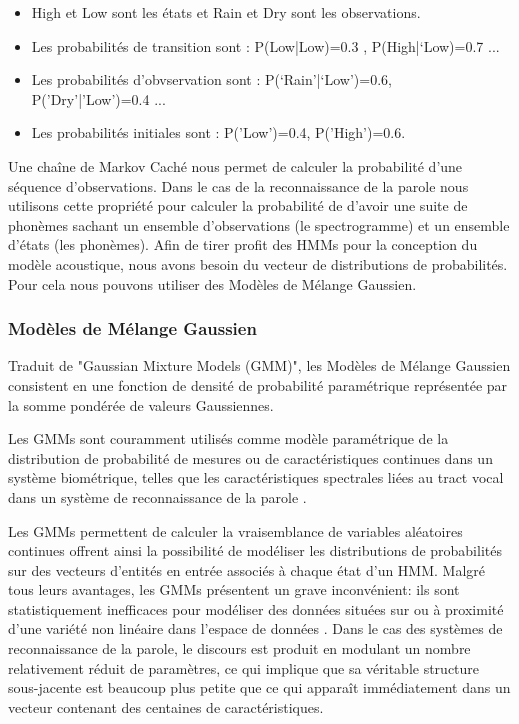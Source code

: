 \begin{itemize}
    \item High et Low sont les états et Rain et Dry sont les observations.
    \item Les probabilités de transition sont : P(Low|Low)=0.3 , P(High|‘Low)=0.7 ...
    \item Les probabilités d'obvservation sont : P(‘Rain'|‘Low')=0.6, P('Dry'|'Low')=0.4 ...
    \item Les probabilités initiales sont : P('Low')=0.4, P('High')=0.6.
\end{itemize}

Une chaîne de Markov Caché nous permet de calculer la probabilité d'une séquence d'observations. Dans le cas de la reconnaissance de la parole nous utilisons cette propriété pour calculer la probabilité de d'avoir une suite de phonèmes sachant un ensemble d'observations (le spectrogramme) et un ensemble d'états (les phonèmes).
Afin de tirer profit des HMMs pour la conception du modèle acoustique, nous avons besoin du vecteur de distributions de probabilités. Pour cela nous pouvons utiliser des Modèles de Mélange Gaussien.

\subsubsection{Modèles de Mélange Gaussien}
Traduit de "Gaussian Mixture Models (GMM)", les Modèles de Mélange Gaussien consistent en une fonction de densité de probabilité paramétrique représentée par la somme pondérée de valeurs Gaussiennes.

Les GMMs sont couramment utilisés comme modèle paramétrique de la distribution de probabilité de mesures ou de caractéristiques continues dans un système biométrique, telles que les caractéristiques spectrales liées au tract vocal dans un système de reconnaissance de la parole \cite{gmmdef}.

Les GMMs permettent de calculer la vraisemblance de variables aléatoires continues offrent ainsi la possibilité de modéliser les distributions de probabilités sur des vecteurs d'entités en entrée associés à chaque état d'un HMM.
Malgré tous leurs avantages, les GMMs présentent un grave inconvénient: ils sont statistiquement inefficaces pour modéliser des données situées sur ou à proximité d'une variété non linéaire dans l'espace de données \cite{dlacoustic}. Dans le cas des systèmes de reconnaissance de la  parole, le discours est produit en modulant un nombre relativement réduit de paramètres, ce qui implique que sa véritable structure sous-jacente est beaucoup plus petite que ce qui apparaît immédiatement dans un vecteur contenant des centaines de caractéristiques.


